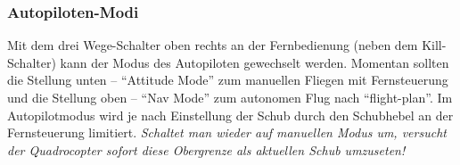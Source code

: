 \subsubsection{Autopiloten-Modi}
Mit dem drei Wege-Schalter oben rechts an der Fernbedienung (neben dem Kill-Schalter) kann der Modus des Autopiloten gewechselt werden.
Momentan sollten die Stellung unten – \enquote{Attitude Mode} zum manuellen Fliegen mit Fernsteuerung und die Stellung oben – \enquote{Nav Mode} zum autonomen Flug nach \enquote{flight-plan}.
Im Autopilotmodus wird je nach Einstellung der Schub durch den Schubhebel an der Fernsteuerung limitiert. \emph{Schaltet man wieder auf manuellen Modus um, versucht der Quadrocopter sofort diese Obergrenze als aktuellen Schub umzuseten!}
